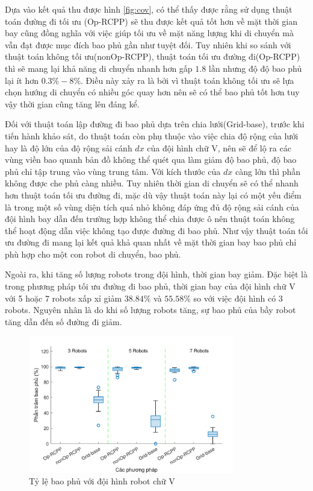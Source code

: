 Dựa vào kết quả thu được hình \ref{fig:cov}, có thể thấy được rằng sử dụng thuật toán đường đi tối ưu (Op-RCPP) sẽ thu được kết quả tốt hơn về mặt thời gian bay cũng đồng nghĩa với việc giúp tối ưu về mặt năng lượng khi di chuyển mà vẫn đạt được mục đích bao phủ gần như tuyệt đối. Tuy nhiên khi so sánh với thuật toán không tối ưu(nonOp-RCPP), thuật toán tối ưu đường đi(Op-RCPP) thì sẽ mang lại khả năng di chuyển nhanh hơn gấp $1.8$ lần nhưng độ độ bao phủ lại ít hơn $0.3\% - 8\%$. Điều này xảy ra là bởi vì thuật toán không tối ưu sẽ lựa chọn hướng di chuyển có nhiều góc quay hơn nên sẽ có thể bao phủ tốt hơn tuy vậy thời gian cũng tăng lên đáng kể. 


Đối với thuật toán lập đường đi bao phủ dựa trên chia lưới(Grid-base), trước khi tiến hành khảo sát, do thuật toán còn phụ thuộc vào việc chia độ rộng của lưới hay là độ lớn của độ rộng sải cánh $dx$ của đội hình chữ V, nên sẽ để lộ ra các vùng viền bao quanh bản đồ không thể quét qua làm giảm độ bao phủ, độ bao phủ chỉ tập trung vào vùng trung tâm. Với kích thước của $dx$ càng lớn thì phần không được che phủ càng nhiều. Tuy nhiên thời gian di chuyển sẽ có thể nhanh hơn thuật toán tối ưu đường đi, mặc dù vậy thuật toán này lại có một yếu điểm là trong một số vùng diện tích quá nhỏ không đáp ứng đủ độ rộng sải cánh của đội hình bay dẫn đến trường hợp không thể chia được ô nên thuật toán không thể hoạt động dẫn việc không tạo được đường đi bao phủ. Như vậy thuật toán tối ưu đường đi mang lại kết quả khả quan nhất về mặt thời gian bay bao phủ chỉ phù hợp cho một con robot di chuyển, bao phủ.

 Ngoài ra, khi tăng số lượng robots trong đội hình, thời gian bay giảm. Đặc biệt là trong phương pháp tối ưu đường đi bao phủ, thời gian bay của đội hình chữ V với 5 hoặc 7 robots xấp xỉ giảm $38.84\%$ và $55.58\%$ so với việc đội hình có 3 robots. Nguyên nhân là do khi số lượng robots tăng, sự bao phủ của bầy robot tăng dẫn đến số đường đi giảm.

\begin{figure}[H]
    \centering
    \includegraphics[width=0.8\textwidth]{chapter5/image/CoveragePer.pdf}
    \caption{Tỷ lệ bao phủ với đội hình robot chữ V}
    \label{fig:covPer}
\end{figure}

